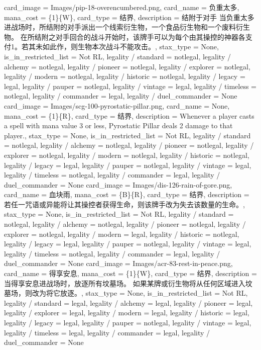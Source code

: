 \documentclass[lang = cn, color = black, 10pt]{AllThatStax}
\begin{document}
\card
{
	card_image = Images/pip-18-overencumbered.png,
	card_name = 负重太多,
	mana_cost = \{1\}\{W\},
	card_type = 结界,
	description = 结附于对手
	当负重太多进战场时，所结附的对手派出一个线索衍生物，一个食品衍生物和一个废料衍生物。
	在所结附之对手回合的战斗开始时，该牌手可以为每个由其操控的神器各支付{1}。若其未如此作，则生物本次战斗不能攻击。,
	stax_type = None,
	is_in_restricted_list = Not RL,
	legality / standard = notlegal,
	legality / alchemy = notlegal,
	legality / pioneer = notlegal,
	legality / explorer = notlegal,
	legality / modern = notlegal,
	legality / historic = notlegal,
	legality / legacy = legal,
	legality / pauper = notlegal,
	legality / vintage = legal,
	legality / timeless = notlegal,
	legality / commander = legal,
	legality / duel_commander = None
}
\card
{
	card_image = Images/scg-100-pyrostatic-pillar.png,
	card_name = None,
	mana_cost = \{1\}\{R\},
	card_type = 结界,
	description = Whenever a player casts a spell with mana value 3 or less, Pyrostatic Pillar deals 2 damage to that player.,
	stax_type = None,
	is_in_restricted_list = Not RL,
	legality / standard = notlegal,
	legality / alchemy = notlegal,
	legality / pioneer = notlegal,
	legality / explorer = notlegal,
	legality / modern = notlegal,
	legality / historic = notlegal,
	legality / legacy = legal,
	legality / pauper = notlegal,
	legality / vintage = legal,
	legality / timeless = notlegal,
	legality / commander = legal,
	legality / duel_commander = None
}
\card
{
	card_image = Images/dis-126-rain-of-gore.png,
	card_name = 血块雨,
	mana_cost = \{B\}\{R\},
	card_type = 结界,
	description = 若任一咒语或异能将让其操控者获得生命，则该牌手改为失去该数量的生命。,
	stax_type = None,
	is_in_restricted_list = Not RL,
	legality / standard = notlegal,
	legality / alchemy = notlegal,
	legality / pioneer = notlegal,
	legality / explorer = notlegal,
	legality / modern = legal,
	legality / historic = notlegal,
	legality / legacy = legal,
	legality / pauper = notlegal,
	legality / vintage = legal,
	legality / timeless = notlegal,
	legality / commander = legal,
	legality / duel_commander = None
}
\card
{
	card_image = Images/acr-83-rest-in-peace.png,
	card_name = 得享安息,
	mana_cost = \{1\}\{W\},
	card_type = 结界,
	description = 当得享安息进战场时，放逐所有坟墓场。
	如果某牌或衍生物将从任何区域进入坟墓场，则改为将它放逐。,
	stax_type = None,
	is_in_restricted_list = Not RL,
	legality / standard = legal,
	legality / alchemy = legal,
	legality / pioneer = legal,
	legality / explorer = legal,
	legality / modern = legal,
	legality / historic = legal,
	legality / legacy = legal,
	legality / pauper = notlegal,
	legality / vintage = legal,
	legality / timeless = legal,
	legality / commander = legal,
	legality / duel_commander = None
}
\end{document}
